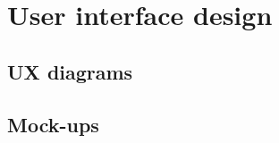 \section{User interface design}
\label{sect:userinterfacedesign}

\subsection{UX diagrams}
\label{subsect:userexpirience}


\subsection{Mock-ups}
\label{subsect:mockups}